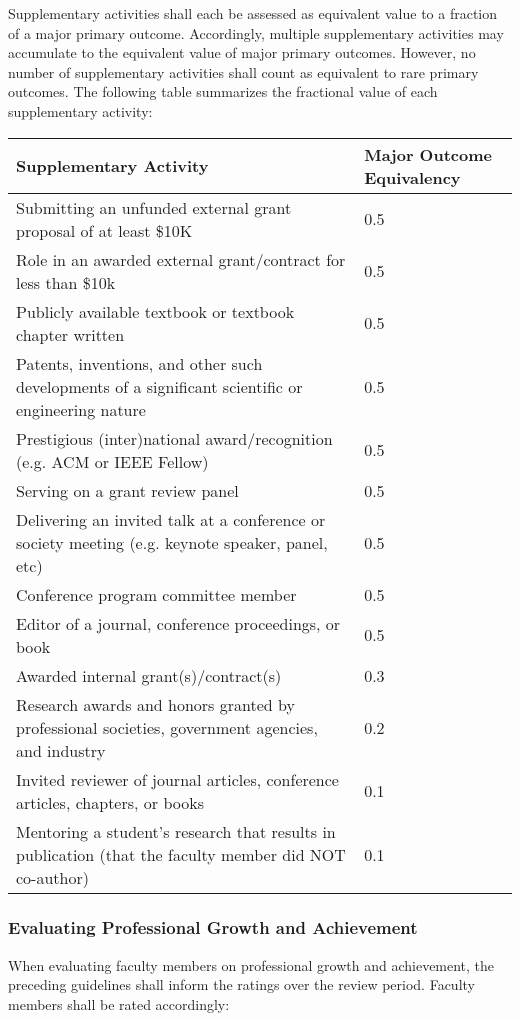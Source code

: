 \documentclass{article}
\begin{document}
Supplementary activities shall each be assessed as equivalent value to a fraction of a major primary outcome. Accordingly, multiple supplementary activities may accumulate to the equivalent value of major primary outcomes. However, no number of supplementary activities shall count as equivalent to rare primary outcomes. The following table summarizes the fractional value of each supplementary activity:

\begin{longtable}{p{12cm}p{2cm}}

\hline
\textbf{Supplementary Activity} & \textbf{Major Outcome Equivalency} \\
\hline
\endhead %
Submitting an unfunded external grant proposal of at least
\$10K	& 0.5\\ \hline
Role in an awarded external grant/contract for less than \$10k	& 0.5\\ \hline
Publicly available textbook or textbook chapter written	& 0.5 \\ \hline
Patents, inventions, and other such developments of a significant scientific or engineering nature &	0.5 \\ \hline
Prestigious (inter)national award/recognition (e.g. ACM or IEEE Fellow)	&0.5\\ \hline
Serving on a grant review panel	&0.5\\ \hline
Delivering an invited talk at a conference or society meeting (e.g. keynote speaker, panel, etc)	& 0.5\\ \hline
Conference program committee member	&0.5\\ \hline
Editor of a journal, conference proceedings, or book	& 0.5\\ \hline
Awarded internal grant(s)/contract(s)	 & 0.3\\ \hline
Research awards and honors granted by professional societies, government agencies, and industry &	0.2\\ \hline
Invited reviewer of journal articles, conference articles, chapters, or books	& 0.1\\ \hline
Mentoring a student’s research that results in publication (that the faculty member did NOT co-author)&	0.1\\ \hline
\end{longtable}

\subsubsection{Evaluating Professional Growth and Achievement}
When evaluating faculty members on professional growth and achievement, the preceding guidelines shall inform the ratings over the review period. Faculty members shall be rated accordingly:
\end{document}
